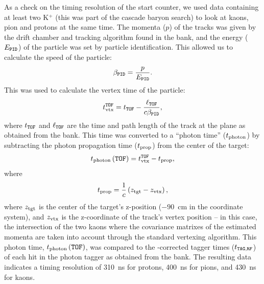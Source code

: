 \FloatBarrier

As a check on the timing resolution of the start counter, we used data containing at least two K$^+$ (this was part of the cascade baryon search) to look at kaons, pion and protons at the same time. The momenta ($p$) of the tracks was given by the drift chamber and tracking algorithm found in the  bank, and the energy ($E_{\mathtt{PID}}$) of the particle was set by particle identification. This allowed us to calculate the speed of the particle:
\begin{equation}
    \beta_{\mathtt{PID}} = \frac{p}{E_{\mathtt{PID}}}.
    \label{eqn:betapid}
\end{equation}
This was used to calculate the vertex time of the particle:
\begin{equation}
    t_{\mathrm{vtx}}^{\mathtt{TOF}} = t_{\mathtt{TOF}} - \frac{\ell_{\mathtt{TOF}}}{c\beta_{\mathtt{PID}}},
    \label{eqn:tvtofpid}
\end{equation}
where $t_{\mathtt{TOF}}$ and $\ell_{\mathtt{TOF}}$ are the time and path length of the track at the  plane as obtained from the  bank. This time was converted to a ``photon time'' ($t_\mathrm{photon}$) by subtracting the photon propagation time ($t_{\mathrm{prop}}$) from the center of the target:
\begin{equation}
    t_\mathrm{photon}\left(\mathtt{TOF}\right) = t_{\mathrm{vtx}}^{\mathtt{TOF}} - t_{\mathrm{prop}},
    \label{eqn:tphotofpid}
\end{equation}
where
\begin{equation}
    t_{\mathrm{prop}} = \frac{1}{c} \left( z_\mathrm{tgt} - z_\mathrm{vtx} \right),
\end{equation}
where $z_\mathrm{tgt}$ is the center of the target's z-position ($-90$~cm in the  coordinate system), and $z_\mathrm{vtx}$ is the z-coordinate of the track's vertex position -- in this case, the intersection of the two kaons where the covariance matrixes of the estimated momenta are taken into account through the standard  vertexing algorithm. This photon time, $t_\mathrm{photon}\left(\mathtt{TOF}\right)$, was compared to the -corrected tagger times ($t_{\mathtt{TAG},\mathtt{RF}}$) of each hit in the photon tagger as obtained from the  bank. The resulting data indicates a timing resolution of 310~ns for protons, 400~ns for pions, and 430~ns for kaons.

